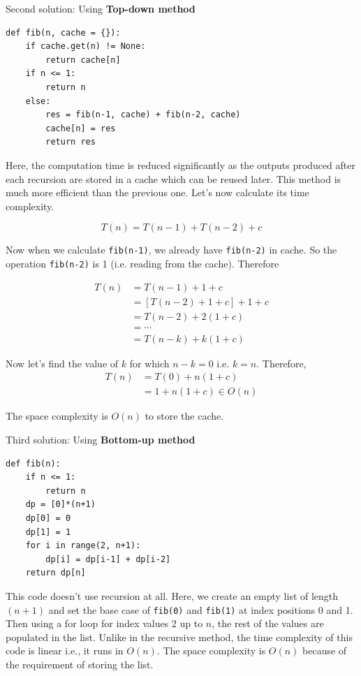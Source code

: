 \documentclass[a4paper,11pt]{book}
\begin{document}
\noindent Second solution: Using \textbf{Top-down method}

\begin{lstlisting}
def fib(n, cache = {}):
    if cache.get(n) != None:
        return cache[n]
    if n <= 1:
        return n
    else:
        res = fib(n-1, cache) + fib(n-2, cache)
        cache[n] = res
        return res
\end{lstlisting}

\noindent Here, the computation time is reduced significantly as the outputs produced after each recursion are stored in a cache which can be reused later. This method is much more efficient than the previous one. Let's now calculate its time complexity.

$$T(n) = T(n-1) + T(n-2) + c$$

\noindent Now when we calculate \lstinline{fib(n-1)}, we already have \lstinline{fib(n-2)} in cache. So the operation \lstinline{fib(n-2)} is 1 (i.e. reading from the cache). Therefore

\begin{align*}
    T(n) &= T(n-1) + 1 + c\\
         &=\left[T(n-2) + 1 + c\right] + 1 + c\\
         &=T(n-2) + 2(1+c)\\
         &= \cdots\\
         &= T(n-k) + k(1+c)
\end{align*}

\noindent Now let's find the value of $k$ for which $n-k = 0$ i.e. $k=n$. Therefore,
\begin{align*}
	T(n) &= T(0) + n(1+c)\\
	     &= 1 + n(1+c) \in O(n)
\end{align*}

\noindent The space complexity is $O(n)$ to store the cache.
\vspace{3mm}

\noindent Third solution: Using \textbf{Bottom-up method}

\begin{lstlisting}
def fib(n):
    if n <= 1:
        return n
    dp = [0]*(n+1)
    dp[0] = 0
    dp[1] = 1 
    for i in range(2, n+1):
        dp[i] = dp[i-1] + dp[i-2]
    return dp[n]
\end{lstlisting}

\noindent This code doesn't use recursion at all. Here, we create an empty list of length $(n+1)$ and set the base case of \lstinline{fib(0)} and \lstinline{fib(1)} at index positions 0 and 1. Then using a for loop for index values 2 up to $n$, the rest of the values are populated in the list. Unlike in the recursive method, the time complexity of this code is linear i.e., it runs in $O(n)$. The space complexity is $O(n)$ because of the requirement of storing the list.
\end{document}
